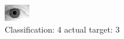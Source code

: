 \begin{figure}[h!]
\begin{center}
\includegraphics[width=0.60\columnwidth]{figures/ID2200_class_4_target_3.png}
\end{center}
\caption{ Classification: 4 actual target: 3}
\label{fig:ID2200_class_4_target_3}
\end{figure}
